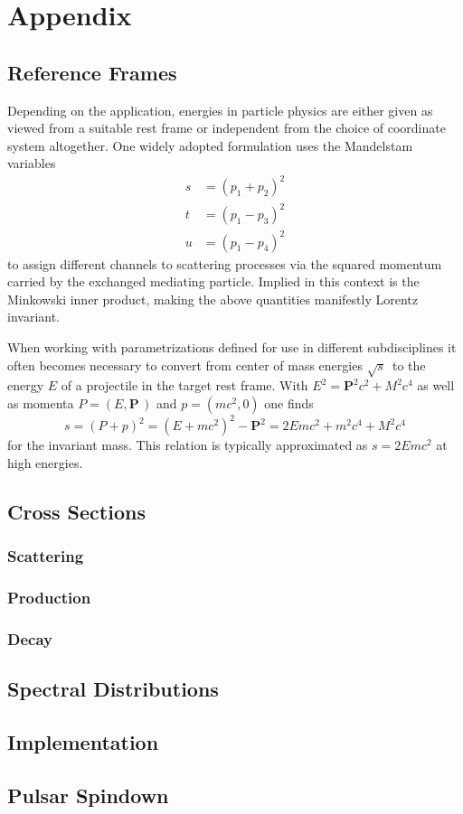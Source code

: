 \chapter*{Appendix}
\label{ch:appendix}

\section{Reference Frames}
\label{sec:frames}

Depending on the application, energies in particle physics are either given as viewed from a suitable rest frame or
independent from the choice of coordinate system altogether. One widely adopted formulation uses the Mandelstam variables
\begin{align*}
	s &= (p_1 + p_2)^2 \\
	t &= (p_1 - p_3)^2 \\
	u &= (p_1 - p_4)^2
\end{align*}
to assign different channels to scattering processes via the squared momentum carried by the exchanged mediating particle.
Implied in this context is the Minkowski inner product, making the above quantities manifestly Lorentz invariant.

When working with parametrizations defined for use in different subdisciplines it often becomes necessary to convert from
center of mass energies $\sqrt{s}\,$ to the energy $E$ of a projectile in the target rest frame. With $E^2 = \bm{P}^2 c^2 + M^2 c^4$
as well as momenta $P = (E, \bm{P}\,)$ and $p = (m c^2 , 0)$ one finds
\begin{equation*}
	s = (P + p)^2 = (E + m c^2)^2 - \bm{P}^2 = 2E m c^2 + m^2 c^4 + M^2 c^4
\end{equation*}
for the invariant mass. This relation is typically approximated as $s = 2E m c^2$ at high energies.


\section{Cross Sections}
\label{sec:cross}

\subsection*{Scattering}

\autocite{Fagundes_2012}

\subsection*{Production}

\subsection*{Decay}

\section{Spectral Distributions}
\label{sec:spectral}

\section{Implementation}
\label{sec:implementation}

\section{Pulsar Spindown}
\label{sec:spindown}
